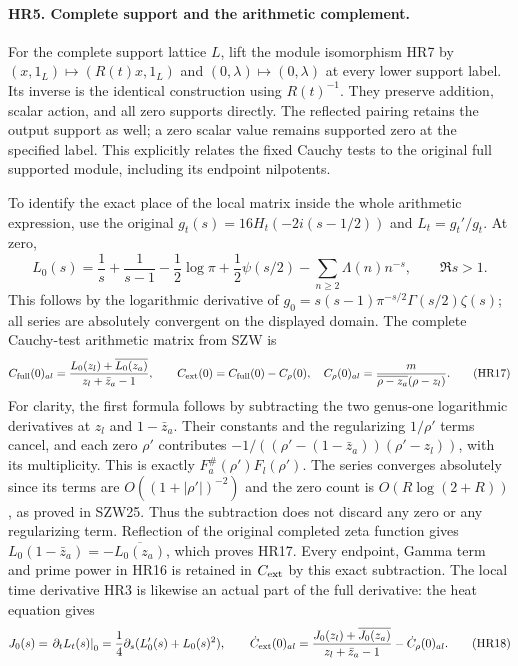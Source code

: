 \documentclass[11pt,a4paper]{article}
\theoremstyle{definition}\newtheorem{definition}[theorem]{Definition}
\begin{document}
\paragraph{HR5. Complete support and the arithmetic complement.}
For the complete support lattice $L$, lift the module isomorphism
HR7 by $(x,1_L)\mapsto(R(t)x,1_L)$ and
$(0,\lambda)\mapsto(0,\lambda)$ at every lower support label.
Its inverse is the identical construction using $R(t)^{-1}$.
They preserve addition, scalar action, and all zero supports
directly. The reflected pairing retains the output support as
well; a zero scalar value remains supported zero at the specified
label. This explicitly relates the fixed Cauchy tests to the
original full supported module, including its endpoint nilpotents.

To identify the exact place of the local matrix inside the whole
arithmetic expression, use the original $g_t(s)=16H_t(-2i(s-1/2))$
and $L_t=g_t'/g_t$. At zero,
\[
 L_0(s)=\frac1s+\frac1{s-1}-\frac12\log\pi
        +\frac12\psi(s/2)-\sum_{n\ge2}\Lambda(n)n^{-s},
       \qquad\Re s>1.
 \tag{HR16}
\]
This follows by the logarithmic derivative of
$g_0=s(s-1)\pi^{-s/2}\Gamma(s/2)\zeta(s)$; all series are
absolutely convergent on the displayed domain. The complete
Cauchy-test arithmetic matrix from SZW is
\[
 C_{\rm full}(0)_{al}
  =\frac{L_0(z_l)+\overline{L_0(z_a)}}{z_l+\bar z_a-1},
 \qquad C_{\rm ext}(0)=C_{\rm full}(0)-C_\rho(0),
 \quad C_\rho(0)_{al}=
 \frac{m}{\overline{\rho-z_a}(\rho-z_l)}.
 \tag{HR17}
\]
For clarity, the first formula follows by subtracting the two
genus-one logarithmic derivatives at $z_l$ and $1-\bar z_a$.
Their constants and the regularizing $1/\rho'$ terms cancel,
and each zero $\rho'$ contributes
$-1/((\rho'-(1-\bar z_a))(\rho'-z_l))$, with its multiplicity.
This is exactly $F_a^\#(\rho')F_l(\rho')$.
The series converges absolutely since its terms are
$O((1+|\rho'|)^{-2})$ and the zero count is
$O(R\log(2+R))$, as proved in SZW25. Thus the subtraction does
not discard any zero or any regularizing term. Reflection of the
original completed zeta function gives
$L_0(1-\bar z_a)=-\overline{L_0(z_a)}$, which proves HR17.
Every endpoint, Gamma term and prime power in HR16 is retained
in $C_{\rm ext}$ by this exact subtraction. The local time
derivative HR3 is likewise an actual part of the full derivative:
the heat equation gives
\[
 J_0(s)=\left.\partial_tL_t(s)\right|_0
       =\frac14\partial_s(L_0'(s)+L_0(s)^2),\qquad
 \dot C_{\rm ext}(0)_{al}=
 \frac{J_0(z_l)+\overline{J_0(z_a)}}{z_l+\bar z_a-1}
       -\dot C_\rho(0)_{al}.
 \tag{HR18}
\]
\end{document}

